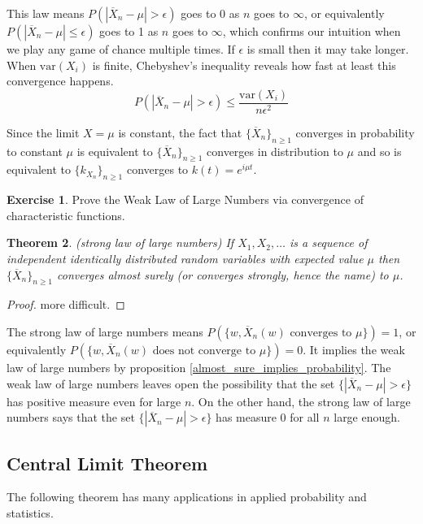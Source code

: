 \documentclass[12pt]{amsart}
\newtheorem{theorem}{Theorem}[section]
\theoremstyle{definition}
\newtheorem{exercise}[theorem]{Exercise}
\begin{document}
This law means $P(|\overline{X}_n - \mu| > \epsilon)$ goes to $0$ as $n$ goes to $\infty$, or equivalently $P(|\overline{X}_n - \mu| \leq \epsilon)$ goes to 1 as $n$ goes to $\infty$, which confirms our intuition when we play any game of chance multiple times. If $\epsilon$ is small then it may take longer. When $\text{var}(X_i)$ is finite, Chebyshev's inequality reveals how fast at least this convergence happens.
$$P(|\overline{X}_n - \mu| > \epsilon) \leq \frac{\text{var}(X_i)}{n\epsilon^2}$$

Since the limit $X = \mu$ is constant, the fact that  $\{\overline{X}_n\}_{n \geq 1}$ converges in probability to constant $\mu$ is equivalent to $\{\overline{X}_n\}_{n \geq 1}$ converges in distribution to $\mu$ and so is equivalent to $\{k_{X_n}\}_{n \geq 1}$ converges to $k(t) = e^{i\mu t}$.

\begin{exercise} Prove the Weak Law of Large Numbers via convergence of characteristic functions.
\end{exercise}

\begin{theorem} (strong law of large numbers) If $X_1, X_2, \dots$ is a sequence of independent identically distributed random variables with expected value $\mu$ then $\{\overline{X}_n\}_{n \geq 1}$ converges almost surely (or converges strongly, hence the name) to $\mu$.
\end{theorem}
\begin{proof} more difficult.
\end{proof}

The strong law of large numbers means $P(\{w, \overline{X}_n(w) \text{ converges to } \mu\}) = 1$, or equivalently $P(\{w, \overline{X}_n(w) \text{ does not converge to } \mu\}) = 0$. It implies the weak law of large numbers by proposition \ref{almost_sure_implies_probability}. The weak law of large numbers leaves open the possibility that the set $\{|\overline{X}_n - \mu| > \epsilon\}$ has positive measure even for large $n$. On the other hand, the strong law of large numbers says that the set $\{|\overline{X}_n - \mu| > \epsilon\}$ has measure 0 for all $n$ large enough.

\subsection{Central Limit Theorem} The following theorem has many applications in applied probability and statistics.
\end{document}
